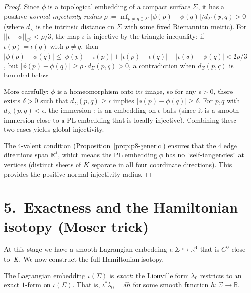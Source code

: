 \begin{proof}
Since $\phi$ is a topological embedding of a compact surface $\Sigma$, it
has a positive \emph{normal injectivity radius}
$\rho := \inf_{p\ne q\in\Sigma} |\phi(p)-\phi(q)| / d_\Sigma(p,q) > 0$
(where $d_\Sigma$ is the intrinsic distance on $\Sigma$ with some fixed
Riemannian metric). For $||\iota - \phi||_{C^0} < \rho/3$, the map $\iota$
is injective by the triangle inequality: if $\iota(p) = \iota(q)$ with
$p\ne q$, then
$|\phi(p)-\phi(q)| \le |\phi(p)-\iota(p)| + |\iota(p)-\iota(q)| +
|\iota(q)-\phi(q)| < 2\rho/3$,
but $|\phi(p)-\phi(q)| \ge \rho\cdot d_\Sigma(p,q) > 0$, a contradiction
when $d_\Sigma(p,q)$ is bounded below.

More carefully: $\phi$ is a homeomorphism onto its image, so for any
$\epsilon>0$, there exists $\delta>0$ such that
$d_\Sigma(p,q)\ge\epsilon$ implies $|\phi(p)-\phi(q)|\ge\delta$. For
$p,q$ with $d_\Sigma(p,q)<\epsilon$, the immersion $\iota$ is an embedding
on $\epsilon$-balls (since it is a smooth immersion close to a PL embedding
that is locally injective). Combining these two cases yields global
injectivity.

The 4-valent condition (Proposition~\ref{prop:p8-generic}) ensures that the
4 edge directions span $\mathbb{R}^4$, which means the PL embedding $\phi$
has no ``self-tangencies'' at vertices (distinct sheets of $K$ separate in
all four coordinate directions). This provides the positive normal
injectivity radius.
\end{proof}

\section*{5.\ Exactness and the Hamiltonian isotopy (Moser trick)}
\label{sec:p8-moser}

At this stage we have a smooth Lagrangian embedding
$\iota: \Sigma\hookrightarrow\mathbb{R}^4$ that is $C^0$-close to~$K$.
We now construct the full Hamiltonian isotopy.

\begin{proposition}[Exactness]
\label{prop:p8-exact}
The Lagrangian embedding $\iota(\Sigma)$ is \emph{exact}: the Liouville
form $\lambda_0$ restricts to an exact $1$-form on $\iota(\Sigma)$. That is,
$\iota^*\lambda_0 = dh$ for some smooth function $h: \Sigma\to\mathbb{R}$.
\end{proposition}

